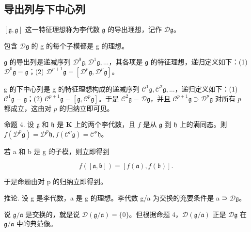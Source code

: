 \subsection{导出列与下中心列}

\([\mathfrak{g},\mathfrak{g}]\) 这一特征理想称为李代数 \(\mathfrak{g}\) 的导出理想，记作 \(\mathcal{D}\mathfrak{g}\)。

包含 \(\mathcal{D}\mathfrak{g}\) 的 g 的每个子模都是 g 的理想。

\(\mathfrak{g}\) 的导出列是递减序列 \(\mathcal{D}^0\mathfrak{g},\mathcal{D}^1\mathfrak{g},\ldots\)，其各项是 \(\mathfrak{g}\) 的特征理想，递归定义如下：(1) \(\mathcal{D}^0\mathfrak{g} = \mathfrak{g}\)；(2) \(\mathcal{D}^{p + 1}\mathfrak{g} = [\mathcal{D}^p\mathfrak{g},\mathcal{D}^p\mathfrak{g}]\)。

g 的下中心列是 g 的特征理想构成的递减序列 \(\mathcal{C}^1\mathfrak{g},\mathcal{C}^2\mathfrak{g},\ldots\)，递归定义如下：(1) \(\mathcal{C}^1\mathfrak{g} = \mathfrak{g}\)；(2) \(\mathcal{C}^{p + 1}\mathfrak{g} = [\mathfrak{g},\mathcal{C}^p\mathfrak{g}]\)。于是 \(\mathcal{C}^2\mathfrak{g} = \mathcal{D}\mathfrak{g}\)，并且 \(\mathcal{C}^{p + 1}\mathfrak{g}\supset \mathcal{D}^{p}\mathfrak{g}\) 对所有 \(p\) 都成立，这由对 \(p\) 的归纳立即可见。

命题 4. 设 \(\mathfrak{g}\) 和 \(\mathfrak{h}\) 是 \(\mathbf{K}\) 上的两个李代数，且 \(f\) 是从 \(\mathfrak{g}\) 到 \(\mathfrak{h}\) 上的满同态。则 \(f(\mathcal{D}^p\mathfrak{g}) = \mathcal{D}^{p}\mathfrak{h}, f(\mathcal{C}^p\mathfrak{g}) = \mathcal{C}^{p}\mathfrak{h}\)。

若 a 和 b 是 g 的子模，则立即得到

\[
f ([ \mathfrak {a}, \mathfrak {b} ]) = [ f (\mathfrak {a}), f (\mathfrak {b}) ].
\]

于是命题由对 p 的归纳立即得到。

推论. 设 g 是李代数，a 是 g 的理想。李代数 g/a 为交换的充要条件是 a ⊃ \(\mathcal{D}\mathfrak{g}\)。

说 \(\mathfrak{g} / \mathfrak{a}\) 是交换的，就是说 \(\mathcal{D}(\mathfrak{g} / \mathfrak{a}) = \{0\}\)。但根据命题 4，\(\mathcal{D}(\mathfrak{g} / \mathfrak{a})\) 正是 \(\mathcal{D}\mathfrak{g}\) 在 \(\mathfrak{g} / \mathfrak{a}\) 中的典范像。

